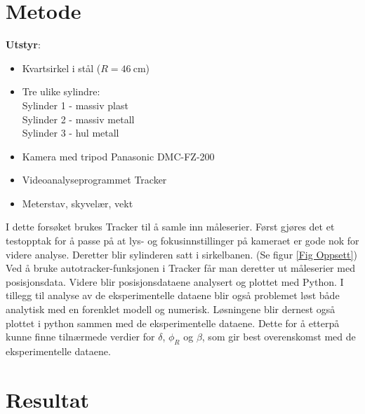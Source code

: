 \documentclass[5p]{elsarticle}
\newcommand{\enhet}[1]{~\mathrm{#1}}  %
\begin{document}
\section{Metode}
\noindent\textbf{Utstyr}:
\begin{itemize}
	\item Kvartsirkel i stål (\(R = 46 \enhet{cm}\))
	\item Tre ulike sylindre:
	\\ Sylinder 1 - massiv plast
	\\ Sylinder 2 - massiv metall 
	\\ Sylinder 3 - hul metall
	\item Kamera med tripod Panasonic DMC-FZ-200
	\item Videoanalyseprogrammet Tracker
	\item Meterstav, skyvelær, vekt
\end{itemize}

I dette forsøket brukes Tracker til å samle inn måleserier. 
Først gjøres det et testopptak for å passe på at lys- og fokusinnstillinger på kameraet er gode nok for videre analyse.
Deretter blir sylinderen satt i sirkelbanen. (Se figur \ref{Fig Oppsett})
Ved å bruke autotracker-funksjonen i Tracker får man deretter ut måleserier med posisjonsdata.
Videre blir posisjonsdataene analysert og plottet med Python. 
I tillegg til analyse av de eksperimentelle dataene blir også problemet løst både analytisk med en forenklet modell og numerisk. Løsningene blir dernest også plottet i python sammen med de eksperimentelle dataene. Dette for å etterpå kunne finne tilnærmede verdier for $\delta$, $\phi_R$ og $\beta$, som gir best overenskomst med de eksperimentelle dataene.

\section{Resultat}
\end{document}
